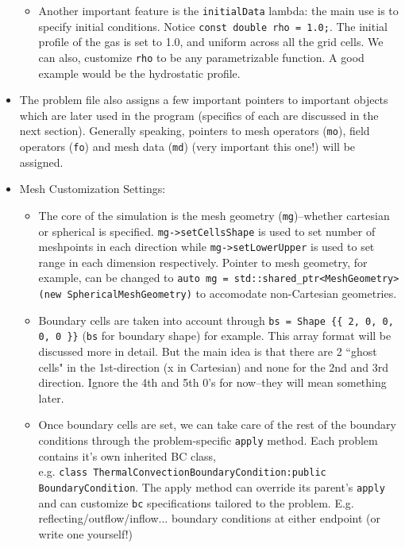 \documentclass{article}
\begin{document}
\begin{itemize}
\begin{itemize}
		\item Another important feature is the \texttt{initialData} lambda: the main use is to specify initial conditions. Notice \texttt{const double rho = 1.0;}. The initial profile of the gas is set to 1.0, and uniform across all the grid cells. We can also, customize \texttt{rho} to be any parametrizable function. A good example would be the hydrostatic profile. 
		
	\end{itemize}		
	
	
	\item The problem file also assigns a few important pointers to important objects which are later used in the program (specifics of each are discussed in the next section). Generally speaking, pointers to mesh operators (\texttt{mo}), field operators (\texttt{fo}) and mesh data (\texttt{md}) (very important this one!) will be assigned.
	
	\item Mesh Customization Settings:
	\begin{itemize}	
		\item The core of the simulation is the mesh geometry (\texttt{mg})--whether cartesian or spherical is specified. \texttt{mg->setCellsShape} is used to set number of meshpoints in each direction while \texttt{mg->setLowerUpper} is used to set range in each dimension respectively. Pointer to mesh geometry, for example, can be changed to \texttt{auto mg = std::shared\_ptr<MeshGeometry> (new SphericalMeshGeometry)} to accomodate non-Cartesian geometries.
		
		\item Boundary cells are taken into account through \texttt{bs = Shape \{\{ 2, 0, 0, 0, 0 \}\}} (\texttt{bs} for boundary shape) for example. This array format will be discussed more in detail. But the main idea is that there are 2 ``ghost cells" in the 1st-direction (x in Cartesian) and none for the 2nd and 3rd direction. Ignore the 4th and 5th 0's for now--they will mean something later. 
		
		\item Once boundary cells are set, we can take care of the rest of the boundary conditions through the problem-specific \texttt{apply} method. Each problem contains it's own inherited BC class, \\
	e.g. \texttt{class ThermalConvectionBoundaryCondition:public BoundaryCondition}. The apply method can override its parent's \texttt{apply} and can customize \texttt{bc} specifications tailored to the problem. E.g. reflecting/outflow/inflow... boundary conditions at either endpoint (or write one yourself!)   
		

\end{itemize}
\end{itemize}
\end{document}

